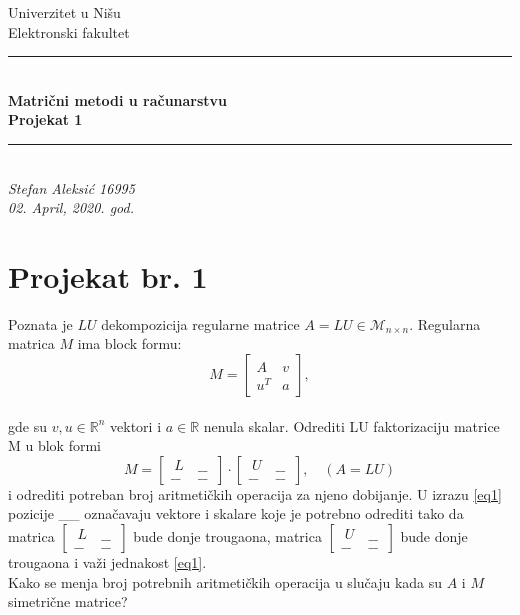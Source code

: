 \documentclass[11pt]{article}
\newcommand{\doublerule}[1][.4pt]{%
  \noindent
  \makebox[0pt][l]{\rule[.7ex]{\linewidth}{#1}}%
  \rule[.3ex]{\linewidth}{#1}}
\begin{document}
\begin{titlepage}
\begin {center}
\huge {Univerzitet u Nišu\\Elektronski fakultet
\vspace{7.5cm}
\\
\doublerule
\\
\vspace{1cm}
\textbf {\Huge{{Matrični metodi u računarstvu \\ Projekat 1}}}
\vspace{1cm}
\\
\doublerule
\\
\vspace{7.5cm}
\textit{{Stefan Aleksić 16995}\\\Large{02. April, 2020. god.}}}
\end{center}
\end{titlepage}
\newpage
\section*{Projekat br. 1}
Poznata je $LU$ dekompozicija regularne matrice $A=LU \in \mathcal {M}_{n\times n}$. Regularna matrica $M$ ima block formu:\\
\begin{equation*}
M=
\begin{bmatrix}
A & v \\ u^T & a
\end{bmatrix},
\end{equation*}
\\gde su $v, u\in \mathbb{R}^n $ vektori i $ a \in \mathbb{R} $ nenula skalar. Odrediti LU faktorizaciju matrice M u blok formi\\
\begin{equation*}\tag{1}\label{eq1}
M=
\begin{bmatrix}
\ L\  & \_\_\ \\ \_\_ & \_\_\ 
\end{bmatrix}
\cdot
\begin{bmatrix}
\ U\  & \_\_\ \\ \_\_ & \_\_\ 
\end{bmatrix},\quad (A=LU)
\end{equation*}
i odrediti potreban broj aritmetičkih operacija za njeno dobijanje. U izrazu \eqref{eq1} pozicije \_\_ označavaju vektore i skalare koje je potrebno odrediti tako da matrica
$ 
\begin{bmatrix}
\ L\  & \_\_\ \\ \_\_ & \_\_\ 
\end{bmatrix}
$
bude donje trougaona, matrica
$
\begin{bmatrix}
\ U\  & \_\_\ \\ \_\_ & \_\_\ 
\end{bmatrix}
$
bude donje trougaona i važi jednakost \eqref{eq1}.\\
Kako se menja broj potrebnih aritmetičkih operacija u slučaju kada su $A$ i $M$ simetrične matrice?
\end{document}
